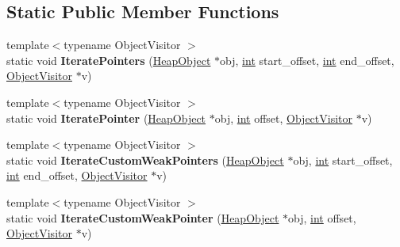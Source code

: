 \subsection*{Static Public Member Functions}
\begin{DoxyCompactItemize}
\item 
\mbox{\label{classv8_1_1internal_1_1BodyDescriptorBase_a2d5a4b7e8eafb91b387894d121c34c71}} 
{\footnotesize template$<$typename Object\+Visitor $>$ }\\static void {\bfseries Iterate\+Pointers} (\mbox{\hyperlink{classv8_1_1internal_1_1HeapObject}{Heap\+Object}} $\ast$obj, \mbox{\hyperlink{classint}{int}} start\+\_\+offset, \mbox{\hyperlink{classint}{int}} end\+\_\+offset, \mbox{\hyperlink{classv8_1_1internal_1_1ObjectVisitor}{Object\+Visitor}} $\ast$v)
\item 
\mbox{\label{classv8_1_1internal_1_1BodyDescriptorBase_ab59534f0648f1b349ca7f805e7718cf4}} 
{\footnotesize template$<$typename Object\+Visitor $>$ }\\static void {\bfseries Iterate\+Pointer} (\mbox{\hyperlink{classv8_1_1internal_1_1HeapObject}{Heap\+Object}} $\ast$obj, \mbox{\hyperlink{classint}{int}} offset, \mbox{\hyperlink{classv8_1_1internal_1_1ObjectVisitor}{Object\+Visitor}} $\ast$v)
\item 
\mbox{\label{classv8_1_1internal_1_1BodyDescriptorBase_a5fb0e0b1327a1e2196d6532257a4849c}} 
{\footnotesize template$<$typename Object\+Visitor $>$ }\\static void {\bfseries Iterate\+Custom\+Weak\+Pointers} (\mbox{\hyperlink{classv8_1_1internal_1_1HeapObject}{Heap\+Object}} $\ast$obj, \mbox{\hyperlink{classint}{int}} start\+\_\+offset, \mbox{\hyperlink{classint}{int}} end\+\_\+offset, \mbox{\hyperlink{classv8_1_1internal_1_1ObjectVisitor}{Object\+Visitor}} $\ast$v)
\item 
\mbox{\label{classv8_1_1internal_1_1BodyDescriptorBase_adfdc32f87986961066fa4192d0edd011}} 
{\footnotesize template$<$typename Object\+Visitor $>$ }\\static void {\bfseries Iterate\+Custom\+Weak\+Pointer} (\mbox{\hyperlink{classv8_1_1internal_1_1HeapObject}{Heap\+Object}} $\ast$obj, \mbox{\hyperlink{classint}{int}} offset, \mbox{\hyperlink{classv8_1_1internal_1_1ObjectVisitor}{Object\+Visitor}} $\ast$v)

\end{DoxyCompactItemize}
